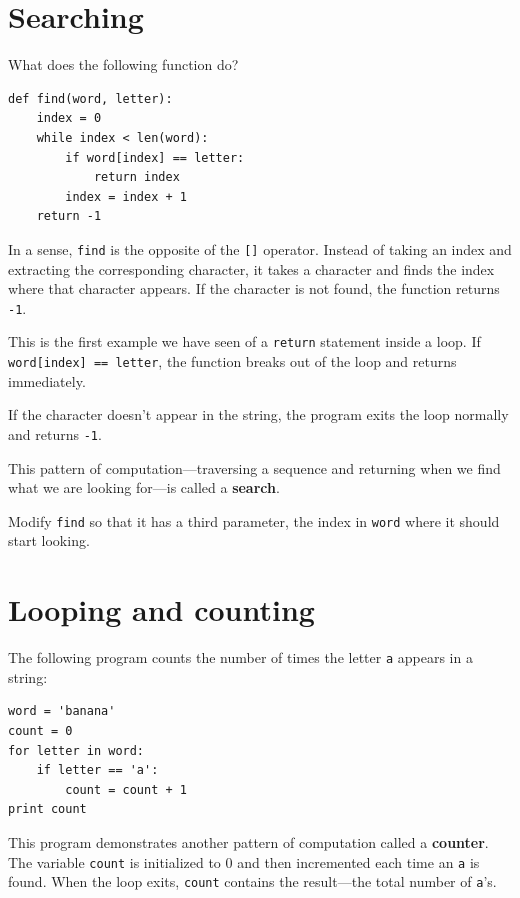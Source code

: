 \documentclass[10pt]{book}
\begin{document}
\begin{CJK}{UTF8}{gbsn}
\section{Searching}
\label{find}

What does the following function do?

\begin{verbatim}
def find(word, letter):
    index = 0
    while index < len(word):
        if word[index] == letter:
            return index
        index = index + 1
    return -1
\end{verbatim}
%
In a sense, {\tt find} is the opposite of the {\tt []} operator.
Instead of taking an index and extracting the corresponding character,
it takes a character and finds the index where that character
appears.  If the character is not found, the function returns {\tt
-1}.

This is the first example we have seen of a {\tt return} statement
inside a loop.  If {\tt word[index] == letter}, the function breaks
out of the loop and returns immediately.

If the character doesn't appear in the string, the program
exits the loop normally and  returns {\tt -1}.

This pattern of computation---traversing a sequence and returning
when we find what we are looking for---is called a {\bf search}.

\begin{exercise}

Modify {\tt find} so that it has a
third parameter, the index in {\tt word} where it should start
looking.

\end{exercise}


\section{Looping and counting}
\label{counter}

The following program counts the number of times the letter {\tt a}
appears in a string:

\begin{verbatim}
word = 'banana'
count = 0
for letter in word:
    if letter == 'a':
        count = count + 1
print count
\end{verbatim}
%
This program demonstrates another pattern of computation called a {\bf
counter}.  The variable {\tt count} is initialized to 0 and then
incremented each time an {\tt a} is found.
When the loop exits, {\tt count}
contains the result---the total number of {\tt a}'s.


\end{CJK}
\end{document}
